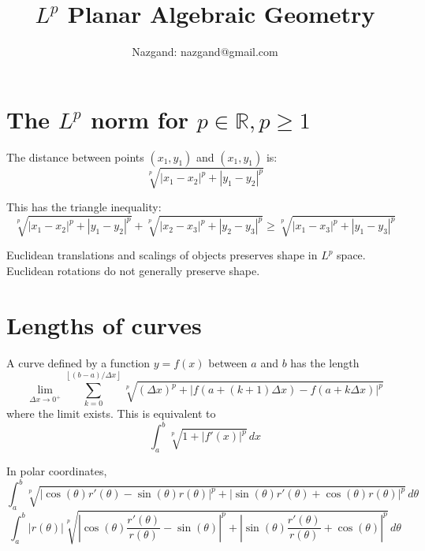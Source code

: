 \documentclass[]{article}
\title{$L^p$ Planar Algebraic Geometry}
\author{Nazgand: nazgand@gmail.com}
\newcommand{\paren}[1]{{\left(#1\right)}}
\newcommand{\abs}[1]{{\left\lvert#1\right\rvert}}
\newcommand{\floor}[1]{{\left\lfloor#1\right\rfloor}}
\begin{document}
\maketitle

\begin{abstract}

\end{abstract}

\section{The $L^p$ norm for $p\in\mathbb{R},p\geq 1$}
The distance between points $\paren{x_1,y_1}$ and $\paren{x_1,y_1}$ is:
\begin{equation}
\sqrt[p]{\abs{x_1-x_2}^p+\abs{y_1-y_2}^p}
\end{equation}

This has the triangle inequality:
\begin{equation}
\sqrt[p]{\abs{x_1-x_2}^p+\abs{y_1-y_2}^p}+
\sqrt[p]{\abs{x_2-x_3}^p+\abs{y_2-y_3}^p}\geq
\sqrt[p]{\abs{x_1-x_3}^p+\abs{y_1-y_3}^p}
\end{equation}

Euclidean translations and scalings of objects preserves shape in $L^p$ space. Euclidean rotations do not generally preserve shape.

\section{Lengths of curves}
A curve defined by a function $y=f\paren{x}$ between $a$ and $b$ has the length
\begin{equation}
\lim\limits_{\Delta x\rightarrow 0^+}\sum_{k=0}^{\floor{\paren{b-a}/\Delta x}}
\sqrt[p]{\paren{\Delta x}^p+\abs{f\paren{a+\paren{k+1}\Delta x}-f\paren{a+k\Delta x}}^p}
\end{equation}
where the limit exists. This is equivalent to
\begin{equation}
\int_{a}^{b}
\sqrt[p]{1+\abs{f'\paren{x}}^p} \,dx
\end{equation}

In polar coordinates,
\begin{equation}
\int_{a}^{b}
\sqrt[p]{\abs{\cos\paren{\theta}r'\paren{\theta}-\sin\paren{\theta}r\paren{\theta}}^p
	+\abs{\sin\paren{\theta}r'\paren{\theta}+\cos\paren{\theta}r\paren{\theta}}^p
} \,d\theta
\end{equation}
\begin{equation}
\label{CurveLengthPolar2}
\int_{a}^{b}
\abs{r\paren{\theta}}
\sqrt[p]{\abs{\cos\paren{\theta}\frac{r'\paren{\theta}}{r\paren{\theta}}-\sin\paren{\theta}}^p
	+\abs{\sin\paren{\theta}\frac{r'\paren{\theta}}{r\paren{\theta}}+\cos\paren{\theta}}^p
} \,d\theta
\end{equation}
\end{document}
